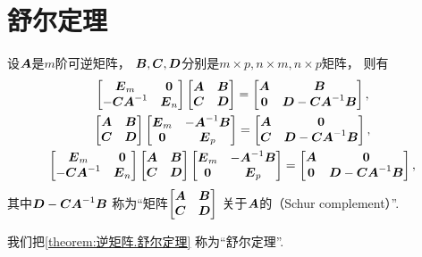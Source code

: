 \section{舒尔定理}
\begin{theorem}\label{theorem:逆矩阵.舒尔定理}
设\(\boldsymbol{A}\)是\(m\)阶可逆矩阵，
\(\boldsymbol{B},\boldsymbol{C},\boldsymbol{D}\)分别是\(m \times p, n \times m, n \times p\)矩阵，
则有\begin{gather}
	\begin{bmatrix}
		\boldsymbol{E}_m & \boldsymbol0 \\
		-\boldsymbol{C}\boldsymbol{A}^{-1} & \boldsymbol{E}_n
	\end{bmatrix}
	\begin{bmatrix}
		\boldsymbol{A} & \boldsymbol{B} \\
		\boldsymbol{C} & \boldsymbol{D}
	\end{bmatrix}
	= \begin{bmatrix}
		\boldsymbol{A} & \boldsymbol{B} \\
		\boldsymbol0 & \boldsymbol{D} - \boldsymbol{C} \boldsymbol{A}^{-1} \boldsymbol{B}
	\end{bmatrix},
	\\
	\begin{bmatrix}
		\boldsymbol{A} & \boldsymbol{B} \\
		\boldsymbol{C} & \boldsymbol{D}
	\end{bmatrix}
	\begin{bmatrix}
		\boldsymbol{E}_m & -\boldsymbol{A}^{-1} \boldsymbol{B} \\
		\boldsymbol0 & \boldsymbol{E}_p
	\end{bmatrix}
	= \begin{bmatrix}
		\boldsymbol{A} & \boldsymbol0 \\
		\boldsymbol{C} & \boldsymbol{D} - \boldsymbol{C} \boldsymbol{A}^{-1} \boldsymbol{B}
	\end{bmatrix},
	\\
	\begin{bmatrix}
		\boldsymbol{E}_m & \boldsymbol0 \\
		-\boldsymbol{C} \boldsymbol{A}^{-1} & \boldsymbol{E}_n
	\end{bmatrix}
	\begin{bmatrix}
		\boldsymbol{A} & \boldsymbol{B} \\
		\boldsymbol{C} & \boldsymbol{D}
	\end{bmatrix}
	\begin{bmatrix}
		\boldsymbol{E}_m & -\boldsymbol{A}^{-1} \boldsymbol{B} \\
		\boldsymbol0 & \boldsymbol{E}_p
	\end{bmatrix}
	= \begin{bmatrix}
		\boldsymbol{A} & \boldsymbol0 \\
		\boldsymbol0 & \boldsymbol{D} - \boldsymbol{C} \boldsymbol{A}^{-1} \boldsymbol{B}
	\end{bmatrix},
\end{gather}
\rm
其中\(\boldsymbol{D} - \boldsymbol{C} \boldsymbol{A}^{-1} \boldsymbol{B}\)
称为“矩阵\(\begin{bmatrix}
	\boldsymbol{A} & \boldsymbol{B} \\
	\boldsymbol{C} & \boldsymbol{D}
\end{bmatrix}\)
关于\(\boldsymbol{A}\)的（Schur complement）”.
\end{theorem}
我们把\cref{theorem:逆矩阵.舒尔定理} 称为“舒尔定理”.

